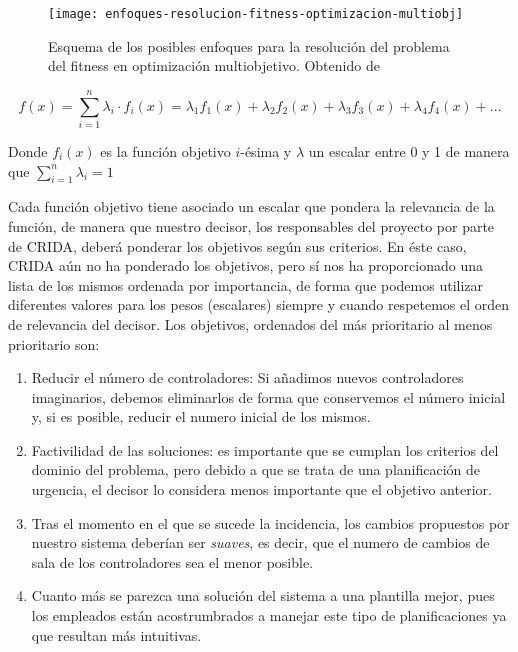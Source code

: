 \begin{figure}
	\centering
	\texttt{[image: enfoques-resolucion-fitness-optimizacion-multiobj]}
	\caption[Esquema de los posibles enfoques para la resolución del problema del fitness en optimización multiobjetivo]{Esquema de los posibles enfoques para la resolución del problema del fitness en optimización multiobjetivo. Obtenido de \cite{sota:metaheuristicas-design-impl}}
	\label{fig:enfoques-fitness-multiobj}
\end{figure}

\[
	f(x) = \sum_{i=1}^{n} \lambda_i \cdot f_i(x) = \lambda_1 f_1(x) + \lambda_2 f_2(x) + \lambda_3 f_3(x) + \lambda_4 f_4(x) + ...
\]

Donde $f_i(x)$ es la función objetivo $i$-ésima y $\lambda$ un escalar entre 0 y 1 de manera que $\sum_{i=1}^n \lambda_i = 1$

Cada función objetivo tiene asociado un escalar que pondera la relevancia de la función, de manera que nuestro decisor, los responsables del proyecto por parte de \gls{CRIDA}, deberá ponderar los objetivos según sus criterios. En éste caso, \gls{CRIDA} aún no ha ponderado los objetivos, pero sí nos ha proporcionado una lista de los mismos ordenada por importancia, de forma que podemos utilizar diferentes valores para los pesos (escalares) siempre y cuando respetemos el orden de relevancia del decisor. Los objetivos, ordenados del más prioritario al menos prioritario son:

\begin{enumerate}[label={O\arabic*}]
	\item \label{O1} Reducir el número de controladores: Si añadimos nuevos controladores imaginarios, debemos eliminarlos de forma que conservemos el número inicial y, si es posible, reducir el numero inicial de los mismos.
	
	\item \label{O2} Factivilidad de las soluciones: es importante que se cumplan los criterios del dominio del problema, pero debido a que se trata de una planificación de urgencia, el decisor lo considera menos importante que el objetivo anterior.
	
	\item \label{O3} Tras el momento en el que se sucede la incidencia, los cambios propuestos por nuestro sistema deberían ser \textit{suaves}, es decir, que el numero de cambios de sala de los controladores sea el menor posible.
	
	\item \label{O4} Cuanto más se parezca una solución del sistema a una plantilla mejor, pues los empleados están acostrumbrados a manejar este tipo de planificaciones ya que resultan más intuitivas.
\end{enumerate}

